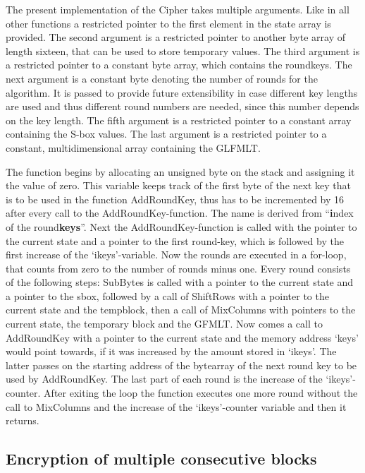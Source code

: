 The present implementation of the Cipher takes multiple arguments. Like
in all other functions a restricted pointer to the first element in the
state array is provided. The second argument is a restricted pointer to
another byte array of length sixteen, that can be used to store temporary
values. The third argument is a restricted pointer to a constant
byte array, which contains the roundkeys. The next argument is a constant
byte denoting the number of rounds for the algorithm. It is passed to
provide future extensibility in case different key lengths are used and
thus different round numbers are needed, since this number depends on
the key length. The fifth argument is a restricted pointer to a constant
array containing the S-box values. The last argument is a restricted
pointer to a constant, multidimensional array containing the GLFMLT.

The function begins by allocating an unsigned byte on the stack and
assigning it the value of zero. This variable keeps track of the first
byte of the next key that is to be used in the function AddRoundKey,
thus has to be incremented by 16 after every call to the
AddRoundKey-function. The name is derived from ``\textbf{i}ndex of the
round\textbf{keys}''. Next the AddRoundKey-function is called with the
pointer to the current state and a pointer to the first round-key, which
is followed by the first increase of the `ikeys'-variable. Now the
rounds are executed in a for-loop, that counts from zero to the number
of rounds minus one. Every round consists of the following steps:
SubBytes is called with a pointer to the current state and a pointer to
the sbox, followed by a call of ShiftRows with a pointer to the current
state and the tempblock, then a call of MixColumns with pointers to the
current state, the temporary block and the GFMLT. Now comes a call to
AddRoundKey with a pointer to the current state and the memory address
`keys' would point towards, if it was increased by the amount stored in
`ikeys'. The latter passes on the starting address of the bytearray of
the next round key to be used by AddRoundKey. The last part of each
round is the increase of the `ikeys'-counter. After exiting the loop the
function executes one more round without the call to MixColumns and the
increase of the `ikeys'-counter variable and then it returns.

\hypertarget{encryption-of-multiple-consecutive-blocks}{%
\subsection{Encryption of multiple consecutive
blocks}\label{encryption-of-multiple-consecutive-blocks}}


